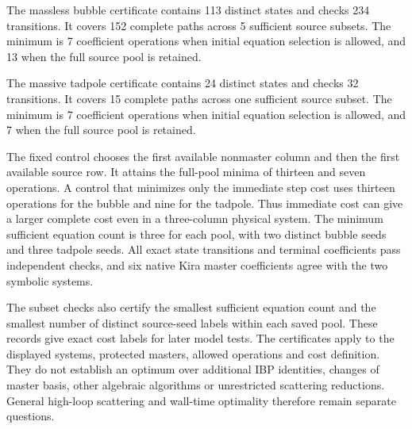 The massless bubble certificate contains 113 distinct states and checks 234 transitions. It covers 152 complete paths across 5 sufficient source subsets. The minimum is 7 coefficient operations when initial equation selection is allowed, and 13 when the full source pool is retained.

The massive tadpole certificate contains 24 distinct states and checks 32 transitions. It covers 15 complete paths across one sufficient source subset. The minimum is 7 coefficient operations when initial equation selection is allowed, and 7 when the full source pool is retained.

The fixed control chooses the first available nonmaster column and then
the first available source row. It attains the full-pool minima
of thirteen and seven operations. A control that minimizes only the
immediate step cost uses thirteen operations for the bubble and nine
for the tadpole. Thus immediate cost can give a larger complete
cost even in a three-column physical system.
The minimum sufficient equation count is three for each pool,
with two distinct bubble seeds and three tadpole seeds.
All exact state transitions and terminal coefficients pass
independent checks, and six native Kira master coefficients agree
with the two symbolic systems.

The subset checks also certify the smallest sufficient equation count
and the smallest number of distinct source-seed labels within each saved
pool. These records give exact cost labels for later model tests.
The certificates apply to the displayed systems, protected masters,
allowed operations and cost definition. They do not establish an
optimum over additional IBP identities, changes of master basis,
other algebraic algorithms or unrestricted scattering reductions.
General high-loop scattering and wall-time optimality therefore
remain separate questions.
\FloatBarrier
